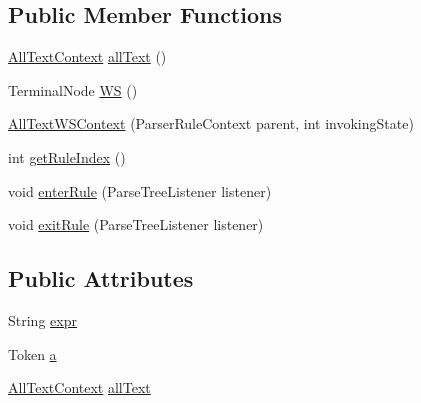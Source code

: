 \subsection*{Public Member Functions}
\begin{DoxyCompactItemize}
\item 
\hyperlink{classgov_1_1nasa_1_1jpf_1_1inspector_1_1client_1_1parser_1_1_console_grammar_parser_1_1_all_text_context}{All\+Text\+Context} \hyperlink{classgov_1_1nasa_1_1jpf_1_1inspector_1_1client_1_1parser_1_1_console_grammar_parser_1_1_all_text_w_s_context_a21d90e7b0da8d9e4cf9a22f268dd9460}{all\+Text} ()
\item 
Terminal\+Node \hyperlink{classgov_1_1nasa_1_1jpf_1_1inspector_1_1client_1_1parser_1_1_console_grammar_parser_1_1_all_text_w_s_context_a105cae4f8c25de1be5a880554d576813}{WS} ()
\item 
\hyperlink{classgov_1_1nasa_1_1jpf_1_1inspector_1_1client_1_1parser_1_1_console_grammar_parser_1_1_all_text_w_s_context_ab53f5b3a9b9235e99657ea345d0aff74}{All\+Text\+W\+S\+Context} (Parser\+Rule\+Context parent, int invoking\+State)
\item 
int \hyperlink{classgov_1_1nasa_1_1jpf_1_1inspector_1_1client_1_1parser_1_1_console_grammar_parser_1_1_all_text_w_s_context_ab2a73df79b969cc59147c0f4f6ba652f}{get\+Rule\+Index} ()
\item 
void \hyperlink{classgov_1_1nasa_1_1jpf_1_1inspector_1_1client_1_1parser_1_1_console_grammar_parser_1_1_all_text_w_s_context_a30440fb25c48b3c05d706b81e26313a9}{enter\+Rule} (Parse\+Tree\+Listener listener)
\item 
void \hyperlink{classgov_1_1nasa_1_1jpf_1_1inspector_1_1client_1_1parser_1_1_console_grammar_parser_1_1_all_text_w_s_context_a78a48ed9000a70d8eb7095c63e9bda57}{exit\+Rule} (Parse\+Tree\+Listener listener)
\end{DoxyCompactItemize}
\subsection*{Public Attributes}
\begin{DoxyCompactItemize}
\item 
String \hyperlink{classgov_1_1nasa_1_1jpf_1_1inspector_1_1client_1_1parser_1_1_console_grammar_parser_1_1_all_text_w_s_context_a5acf9404cc890dabadef183bbf4680a9}{expr}
\item 
Token \hyperlink{classgov_1_1nasa_1_1jpf_1_1inspector_1_1client_1_1parser_1_1_console_grammar_parser_1_1_all_text_w_s_context_a3dd610ce7d581da1b8217579e607a2f5}{a}
\item 
\hyperlink{classgov_1_1nasa_1_1jpf_1_1inspector_1_1client_1_1parser_1_1_console_grammar_parser_1_1_all_text_context}{All\+Text\+Context} \hyperlink{classgov_1_1nasa_1_1jpf_1_1inspector_1_1client_1_1parser_1_1_console_grammar_parser_1_1_all_text_w_s_context_a65fe82f9d71a79370f40567e41ca18b9}{all\+Text}
\end{DoxyCompactItemize}


